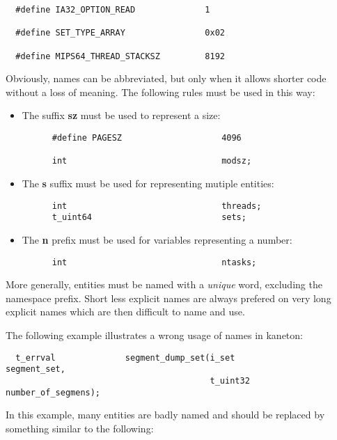 \begin{verbatim}
  #define IA32_OPTION_READ              1

  #define SET_TYPE_ARRAY                0x02

  #define MIPS64_THREAD_STACKSZ         8192
\end{verbatim}

Obviously, names can be abbreviated, but only when it allows shorter code
without a loss of meaning. The following rules must be used in this way:

\begin{itemize}
  \item
    The suffix \textbf{sz} must be used to represent a size:

    \begin{verbatim}
      #define PAGESZ                    4096

      int                               modsz;
    \end{verbatim}
  \item
    The \textbf{s} suffix must be used for representing mutiple entities:

    \begin{verbatim}
      int                               threads;
      t_uint64                          sets;
    \end{verbatim}
  \item
    The \textbf{n} prefix must be used for variables representing a number:

    \begin{verbatim}
      int                               ntasks;
    \end{verbatim}
\end{itemize}

More generally, entities must be named with a \textit{unique} word,
excluding the namespace prefix. Short less explicit names are always prefered
on very long explicit names which are then difficult to name and use.

The following example illustrates a wrong usage of names in kaneton:

\begin{verbatim}
  t_errval              segment_dump_set(i_set              segment_set,
                                         t_uint32           number_of_segmens);
\end{verbatim}

In this example, many entities are badly named and should be replaced by
something similar to the following:

